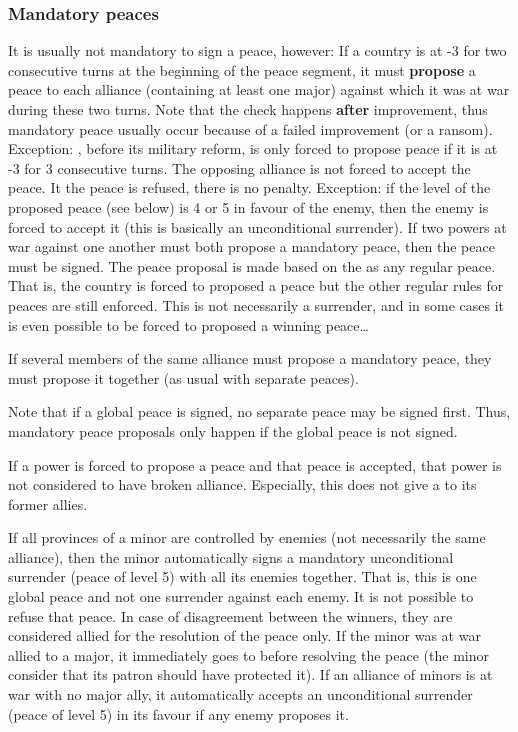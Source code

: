\subsubsection{Mandatory peaces}\label{chPeace:Mandatory peaces}
 It is usually not mandatory to sign a
peace, however:
\bparag If a country is at -3 \STAB for two consecutive turns at the beginning
of the peace segment, it must \textbf{propose} a peace to each alliance
(containing at least one major) against which it was at war during these two
turns. Note that the check happens \textbf{after} \STAB improvement, thus
mandatory peace usually occur because of a failed improvement (or a ransom).
\bparag Exception: \RUS, before its military reform, is only forced to propose
peace if it is at -3 \STAB for 3 consecutive turns.
\bparag The opposing alliance is not forced to accept the peace. It the peace
is refused, there is no penalty.
\bparag Exception: if the level of the proposed peace (see below) is 4 or 5 in
favour of the enemy, then the enemy is forced to accept it (this is basically
an unconditional surrender).
\bparag If two powers at war against one another must both propose a mandatory
peace, then the peace must be signed.
\bparag The peace proposal is made based on the  as
any regular peace. That is, the country is forced to proposed a peace but the
other regular rules for peaces are still enforced. This is not necessarily a
surrender, and in some cases it is even possible to be forced to proposed a
winning peace\ldots

\bparag If several members of the same alliance must propose a mandatory
peace, they must propose it together (as usual with separate peaces).

 Note that if a global peace is
signed, no separate peace may be signed first. Thus, mandatory peace proposals
only happen if the global peace is not signed.

\bparag If a power is forced to propose a peace and that peace is accepted,
that power is not considered to have broken alliance.
\bparag Especially, this does not give a \CB to its former allies.

\bparag If all provinces of a minor are controlled by enemies (not necessarily
the same alliance), then the minor automatically signs a mandatory
unconditional surrender (peace of level 5) with all its enemies together. That
is, this is one global peace and not one surrender against each enemy.
\bparag It is not possible to refuse that peace. In case of disagreement
between the winners, they are considered allied for the resolution of the
peace only.
\bparag If the minor was at war allied to a major, it immediately goes to
\Neutral before resolving the peace (the minor consider that its patron should
have protected it).
\bparag If an alliance of minors is at war with no major ally, it
automatically accepts an unconditional surrender (peace of level 5) in its
favour if any enemy proposes it.

